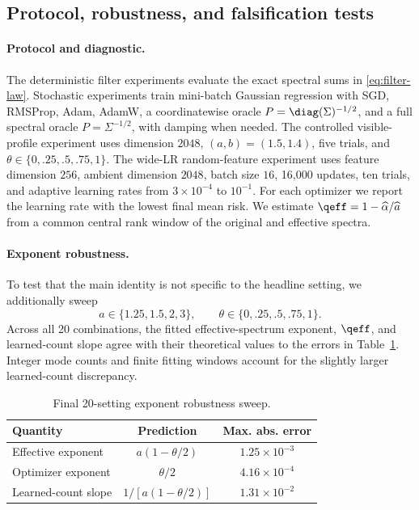 
\subsection{Protocol, robustness, and falsification tests}

\paragraph{Protocol and diagnostic.}
The deterministic filter experiments evaluate the exact spectral sums in \eqref{eq:filter-law}.  Stochastic experiments train mini-batch Gaussian regression with SGD, RMSProp, Adam, AdamW, a coordinatewise oracle $P=\diag(\Sigma)^{-1/2}$, and a full spectral oracle $P=\Sigma^{-1/2}$, with damping when needed.  The controlled visible-profile experiment uses dimension $2048$, $(a,b)=(1.5,1.4)$, five trials, and $\theta\in\{0,.25,.5,.75,1\}$.  The wide-LR random-feature experiment uses feature dimension $256$, ambient dimension $2048$, batch size $16$, 16,000 updates, ten trials, and adaptive learning rates from $3\times10^{-4}$ to $10^{-1}$.  For each optimizer we report the learning rate with the lowest final mean risk.  We estimate $\qeff=1-\widehat\alpha/\widehat a$ from a common central rank window of the original and effective spectra.

\paragraph{Exponent robustness.}
To test that the main identity is not specific to the headline setting, we additionally sweep
\[
 a\in\{1.25,1.5,2,3\},
 \qquad
 \theta\in\{0,.25,.5,.75,1\}.
\]
Across all 20 combinations, the fitted effective-spectrum exponent, $\qeff$, and learned-count slope agree with their theoretical values to the errors in Table~\ref{tab:robustness}.  Integer mode counts and finite fitting windows account for the slightly larger learned-count discrepancy.

\begin{table}[t]
\centering
\small
\caption{Final 20-setting exponent robustness sweep.}
\label{tab:robustness}
\begin{tabular}{lcc}
\toprule
Quantity & Prediction & Max. abs. error\\
\midrule
Effective exponent & $a(1-\theta/2)$ & $1.25\times10^{-3}$\\
Optimizer exponent & $\theta/2$ & $4.16\times10^{-4}$\\
Learned-count slope & $1/[a(1-\theta/2)]$ & $1.31\times10^{-2}$\\
\bottomrule
\end{tabular}
\end{table}

